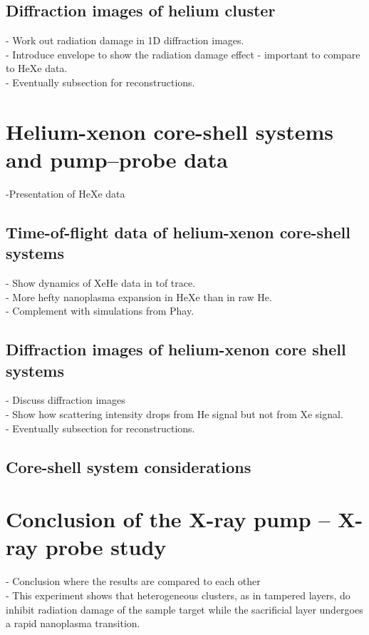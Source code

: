 \subsection{Diffraction images of helium cluster}
- Work out radiation damage in 1D diffraction images.\\
- Introduce envelope to show the radiation damage effect - important to compare to HeXe data.\\
- Eventually subsection for reconstructions.
\section{Helium-xenon core-shell systems and pump--probe data}
-Presentation of HeXe data
\subsection{Time-of-flight data of helium-xenon core-shell systems}
- Show dynamics of XeHe data in tof trace.\\
- More hefty nanoplasma expansion in HeXe than in raw He.\\
- Complement with simulations from Phay.
\subsection{Diffraction images of helium-xenon core shell systems}
- Discuss diffraction images\\
- Show how scattering intensity drops from He signal but not from Xe signal.\\
- Eventually subsection for reconstructions.
\subsection{Core-shell system considerations}
\section{Conclusion of the X-ray pump -- X-ray probe study}
- Conclusion where the results are compared to each other\\
- This experiment shows that heterogeneous clusters, as in tampered layers, do inhibit radiation damage of the sample target while the sacrificial layer undergoes a rapid nanoplasma transition.